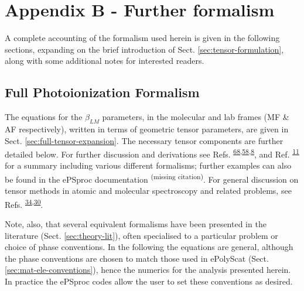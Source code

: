 \documentclass[10pt]{article}
\begin{document}
\section{Appendix B - Further formalism\label{sec:Appendix-B}}

A complete accounting of the formalism used herein is given in the following sections, expanding on the brief introduction of Sect. \ref{sec:tensor-formulation}, along with some additional notes for interested readers.

\subsection{Full Photoionization Formalism \label{appendix:formalism}}


The equations for the \(\beta_{LM}\) parameters, in the molecular and
lab frames (MF \& AF respectively), written in terms of geometric
tensor parameters, are given in Sect. \ref{sec:full-tensor-expansion}. The necessary tensor components are further detailed below. For further discussion and derivations see Refs. \textsuperscript{\hyperref[csl:68]{68},\hyperref[csl:58]{58},\hyperref[csl:8]{8}}, and Ref. \textsuperscript{\hyperref[csl:11]{11}} for a summary including various different formalisms; further examples can also be found in the ePSproc documentation \textsuperscript{(missing citation)}. For general discussion on tensor methods in atomic and molecular spectroscopy and related problems, see Refs. \textsuperscript{\hyperref[csl:34]{34},\hyperref[csl:30]{30}}. 

Note, also, that several equivalent formalisms have been presented in the literature (Sect. \ref{sec:theory-lit}), often specialised to a particular problem or choice of phase conventions. In the following the equations are general, although the phase conventions are chosen to match those used in ePolyScat (Sect. \ref{sec:mat-ele-conventions}), hence the numerics for the analysis presented herein. In practice the ePSproc codes allow the user to set these conventions as desired. %

\end{document}
